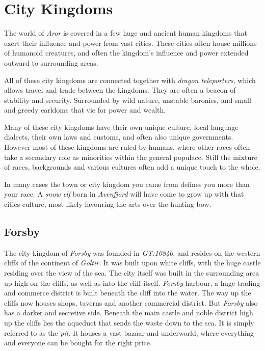 \section*{City Kingdoms}

The world of \emph{Aror} is covered in a few huge and ancient human kingdoms
that exert their influence and power from vast cities. These cities often house
millions of humanoid creatures, and often the kingdom's influence and power
extended outward to surrounding areas.

All of these city kingdoms are connected together with \emph{dragon
  teleporters}, which allows travel and trade between the kingdoms. They are
often a beacon of stability and security. Surrounded by wild nature, unstable
baronies, and small and greedy earldoms that vie for power and wealth.

Many of these city kingdoms have their own unique culture, local language
dialects, their own laws and customs, and often also unique governments. However
most of these kingdoms are ruled by humans, where other races often take a
secondary role as minorities within the general populace. Still the mixture
of races, backgrounds and various cultures often add a unique touch to the
whole.

In many cases the town or city kingdom you came from defines you more than
your race. A \emph{snow elf} born in \emph{Avenfjord} will have come to grow
up with that cities culture, most likely favouring the arts over the hunting
bow.

\subsection*{Forsby}


The city kingdom of \emph{Forsby} was founded in \emph{GT:10840}, and resides
on the western cliffs of the continent of \emph{Goltir}. It was built upon
white cliffs, with the huge castle residing over the view of the sea. The city
itself was built in the surrounding area up high on the cliffs, as well as
into the cliff itself. \emph{Forsby} harbour, a huge trading and commerce
district is built beneath the cliff into the water. The way up the cliffs now
houses shops, taverns and another commercial district. But \emph{Forsby} also
has a darker and secretive side. Beneath the main castle and noble district
high up the cliffs lies the aqueduct that sends the waste down to the sea. It
is simply referred to as the \emph{pit}. It houses a vast bazaar and underworld,
where everything and everyone can be bought for the right price.

